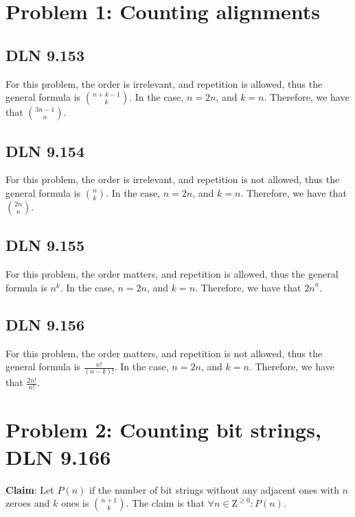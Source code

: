 \documentclass[titlepage]{article}
\begin{document}
 \maketitle

\section{Problem 1: Counting alignments}

\subsection{DLN 9.153}

For this problem, the order is irrelevant, and repetition is allowed, thus the general formula is ${n+k-1}\choose{k}$. In the case, $n=2n$, and $k=n$. Therefore, we have that ${3n-1}\choose{n}$.

\subsection{DLN 9.154}

For this problem, the order is irrelevant, and repetition is not allowed, thus the general formula is ${n}\choose{k}$. In the case, $n=2n$, and $k=n$. Therefore, we have that ${2n}\choose{n}$.

\subsection{DLN 9.155}

For this problem, the order matters, and repetition is allowed, thus the general formula is $n^k$. In the case, $n=2n$, and $k=n$. Therefore, we have that ${2n}^n$.

\subsection{DLN 9.156}

For this problem, the order matters, and repetition is not allowed, thus the general formula is $\frac{n!}{(n-k)!}$. In the case, $n=2n$, and $k=n$. Therefore, we have that $\frac{2n!}{n!}$.

\section{Problem 2: Counting bit strings, DLN 9.166}

\textbf{Claim}: Let $P(n)$ if the number of bit strings without any adjacent ones with $n$ zeroes and $k$ ones is ${n+1}\choose{k}$.  The claim is that $\forall n \in \mathrm{Z}^{\geq 0}: P(n)$.
\end{document}
